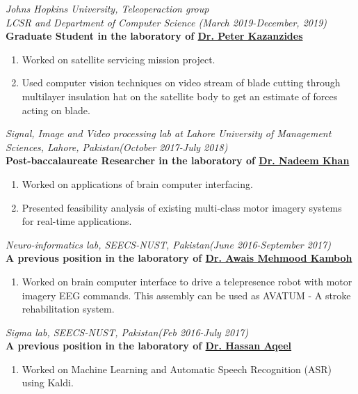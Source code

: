\textit{Johns Hopkins University, Teleoperaction group}\\
\textit{LCSR and Department of Computer Science \hfill(March 2019-December, 2019)}\\
\textbf{\rmfamily Graduate Student in the laboratory of \ul{Dr. Peter Kazanzides}}

\begin{enumerate}
\item Worked on satellite servicing mission project. 
\item Used computer vision techniques on video stream of blade cutting through multilayer insulation hat on the satellite body to get an estimate of forces acting on blade.
\end{enumerate}

\textit{Signal, Image and Video processing lab at Lahore University of Management Sciences, Lahore, Pakistan\hfill(October 2017-July 2018)}\\
\textbf{\rmfamily Post-baccalaureate Researcher in the laboratory of \ul{Dr. Nadeem Khan}}

\begin{enumerate}
\item Worked on applications of brain computer interfacing.
\item Presented feasibility analysis of existing multi-class motor imagery systems for real-time applications. 
\end{enumerate}

\textit{Neuro-informatics lab, SEECS-NUST, Pakistan\hfill(June 2016-September 2017)}\\
\textbf{\rmfamily A previous position in the laboratory of \ul{Dr. Awais Mehmood Kamboh}}

\begin{enumerate}
\item Worked on brain computer interface to drive a telepresence robot with motor imagery EEG commands. This assembly can be used as AVATUM - A stroke rehabilitation system.
\end{enumerate}

\textit{Sigma lab, SEECS-NUST, Pakistan\hfill(Feb 2016-July 2017)}\\
\textbf{\rmfamily A previous position in the laboratory of \ul{Dr. Hassan Aqeel}}

\begin{enumerate}
\item Worked on Machine Learning and Automatic Speech Recognition (ASR) using Kaldi.
\end{enumerate}


